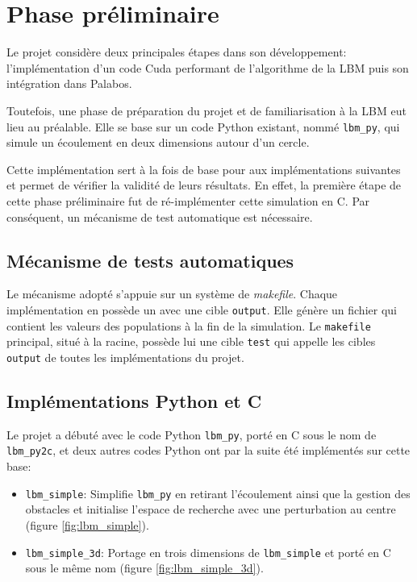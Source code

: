 \section{Phase préliminaire}
Le projet considère deux principales étapes dans son développement: l'implémentation d'un code Cuda performant de l'algorithme de la \ac{LBM} puis son intégration dans Palabos.

Toutefois, une phase de préparation du projet et de familiarisation à la \ac{LBM} eut lieu au préalable. Elle se base sur un code Python existant, nommé \texttt{lbm\_py}, qui simule un écoulement en deux dimensions autour d'un cercle. 

Cette implémentation sert à la fois de base pour aux implémentations suivantes et permet de vérifier la validité de leurs résultats. En effet, la première étape de cette phase préliminaire fut de ré-implémenter cette simulation en C. Par conséquent, un mécanisme de test automatique est nécessaire.

\subsection{Mécanisme de tests automatiques} \label{title-tests}

Le mécanisme adopté s'appuie sur un système de \textit{makefile}. Chaque implémentation en possède un avec une cible \texttt{output}. Elle génère un fichier qui contient les valeurs des populations à la fin de la simulation. Le \texttt{makefile} principal, situé à la racine, possède lui une cible \texttt{test} qui appelle les cibles \texttt{output} de toutes les implémentations du projet.

\subsection{Implémentations Python et C}  \label{title-implementation_python_C}

Le projet a débuté avec le code Python \texttt{lbm\_py}, porté en C sous le nom de \texttt{lbm\_py2c}, et deux autres codes Python ont par la suite été implémentés sur cette base:
\begin{itemize}
\item \texttt{lbm\_simple}: Simplifie \texttt{lbm\_py} en retirant l'écoulement ainsi que la gestion des obstacles et initialise l'espace de recherche avec une perturbation au centre (figure \ref{fig:lbm_simple}). 
\item \texttt{lbm\_simple\_3d}: Portage en trois dimensions de \texttt{lbm\_simple} et porté en C sous le même nom (figure \ref{fig:lbm_simple_3d}). 
\end{itemize}

